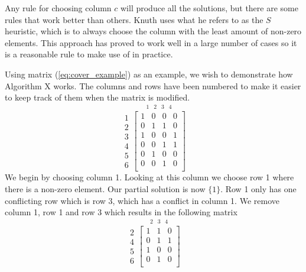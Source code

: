 Any rule for choosing column $c$ will produce all the solutions, but there are some rules that work better than others.
Knuth uses what he refers to as the $S$ heuristic, which is to always choose the column with the least amount of non-zero elements.
This approach has proved to work well in a large number of cases so it is a reasonable rule to make use of in practice.

Using matrix (\ref{eq:cover_example}) as an example, we wish to demonstrate how Algorithm X works.
The columns and rows have been numbered to make it easier to keep track of them when the matrix is modified.
\begin{equation*}
	\label{eq:ces1}
	\begin{array}{r} 1\\ 2\\ 3\\ 4\\ 5\\ 6 \end{array}
	\stackrel{
		\begin{array}{cccc} 1 & 2 & 3 & 4 \end{array}
	}{
		\begin{bmatrix}
			1 & 0 & 0 & 0 \\
			0 & 1 & 1 & 0 \\
			1 & 0 & 0 & 1 \\
			0 & 0 & 1 & 1 \\
			0 & 1 & 0 & 0 \\
			0 & 0 & 1 & 0 \\
		\end{bmatrix}
	}
\end{equation*}
We begin by choosing column 1.
Looking at this column we choose row 1 where there is a non-zero element.
Our partial solution is now $\{ 1 \}$.
Row 1 only has one conflicting row which is row 3, which has a conflict in column 1.
We remove column 1, row 1 and row 3 which results in the following matrix
\begin{equation}
	\label{eq:ces2}
	\begin{array}{r} 2\\ 4\\ 5\\ 6 \end{array}
	\stackrel{
		\begin{array}{ccc} 2 & 3 & 4 \end{array}
	}{
		\begin{bmatrix}
			1 & 1 & 0 \\
			0 & 1 & 1 \\
			1 & 0 & 0 \\
			0 & 1 & 0 \\
		\end{bmatrix}
	}
\end{equation}
